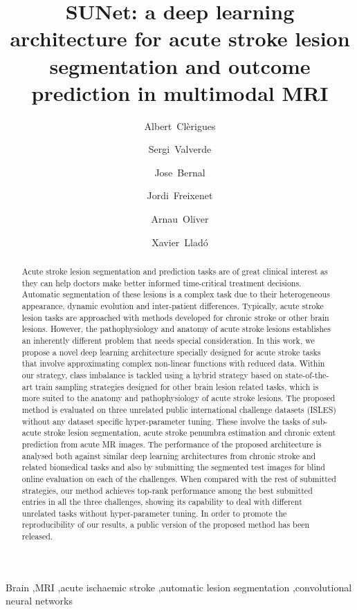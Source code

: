 \documentclass[letterpaper,final,authoryear,3p,times,twocolumn]{elsarticle}
\begin{document}
	
\begin{frontmatter}
	
	\title{SUNet: a deep learning architecture for acute stroke lesion segmentation and outcome prediction in multimodal MRI}
	
	\author{Albert~Cl\`erigues }
	\author{Sergi~Valverde \corref{}}
	\author{Jose~Bernal \corref{}}
	\author{Jordi~Freixenet \corref{}}
	\author{Arnau~Oliver \corref{}}
	\author{Xavier~Llad\'o \corref{}}
	
	\address{Institute of Computer Vision and Robotics, University of Girona, Spain}
	
	
	\begin{abstract}
		Acute stroke lesion segmentation and prediction tasks are of great clinical interest as they can help doctors make better informed time-critical treatment decisions. Automatic segmentation of these lesions is a complex task due to their heterogeneous appearance, dynamic evolution and inter-patient differences. Typically, acute stroke lesion tasks are approached with methods developed for chronic stroke or other brain lesions. However, the pathophysiology and anatomy of acute stroke lesions establishes an inherently different problem that needs special consideration. In this work, we propose a novel deep learning architecture specially designed for acute stroke tasks that involve approximating complex non-linear functions with reduced data. Within our strategy, class imbalance is tackled using a hybrid strategy based on state-of-the-art train sampling strategies designed for other brain lesion related tasks, which is more suited to the anatomy and pathophysiology of acute stroke lesions. The proposed method is evaluated on three unrelated public international challenge datasets (ISLES) without any dataset specific hyper-parameter tuning. These involve the tasks of sub-acute stroke lesion segmentation, acute stroke penumbra estimation and chronic extent prediction from acute MR images. The performance of the proposed architecture is analysed both against similar deep learning architectures from chronic stroke and related biomedical tasks and also by submitting the segmented test images for blind online evaluation on each of the challenges. When compared with the rest of submitted strategies, our method achieves top-rank performance among the best submitted entries in all the three challenges, showing its capability to deal with different unrelated tasks without hyper-parameter tuning. In order to promote the reproducibility of our results, a public version of the proposed method has been released.
	\end{abstract}
	
	\begin{keyword}
		Brain \sep MRI \sep acute ischaemic stroke \sep automatic lesion segmentation \sep convolutional neural networks 
	\end{keyword}
	
\end{frontmatter}
\end{document}
